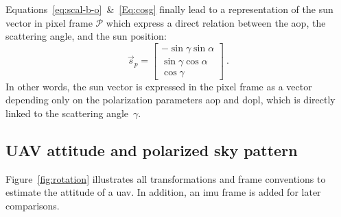 Equations~\eqref{eq:scal-b-o}~\&~\eqref{Eq:cosg} finally lead to a
representation of the sun vector in pixel frame $\mathcal{P}$ which express a
direct relation between the \gls{aop}, the scattering angle, and the sun
position:
\begin{equation}
  \label{eq:sunp}
  \vec{s}_{p} =
    \begin{bmatrix}
    -\sin\gamma \sin\alpha\\
    \sin\gamma \cos\alpha\\
    \cos\gamma
  \end{bmatrix} \ .
\end{equation}
In other words, the sun vector is expressed in the pixel frame as a vector
depending only on the polarization parameters \gls{aop} and \gls{dopl}, which
is directly linked to the scattering angle~$\gamma$.

\subsection{UAV attitude and polarized sky pattern}
\label{subsec:ps-attitude}

Figure~\ref{fig:rotation} illustrates all transformations and frame conventions
to estimate the attitude of a \gls{uav}. In addition, an \gls{imu}
frame is added for later comparisons.


